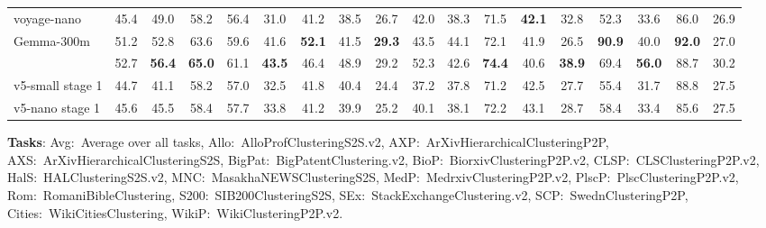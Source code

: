 \documentclass[11pt]{article}
\begin{document}
\begin{table}[H]
\begin{tabular}{l*{17}{c}}
voyage-nano & 45.4 & 49.0 & 58.2 & 56.4 & 31.0 & 41.2 & 38.5 & 26.7 & 42.0 & 38.3 & 71.5 & \textbf{42.1} & 32.8 & 52.3 & 33.6 & 86.0 & 26.9 \\
Gemma-300m & 51.2 & 52.8 & 63.6 & 59.6 & 41.6 & \textbf{52.1} & 41.5 & \textbf{29.3} & 43.5 & 44.1 & 72.1 & 41.9 & 26.5 & \textbf{90.9} & 40.0 & \textbf{92.0} & 27.0 \\
\JEmbeddingVFiveTextNanoShort{} & 52.7 & \textbf{56.4} & \textbf{65.0} & 61.1 & \textbf{43.5} & 46.4 & 48.9 & 29.2 & 52.3 & 42.6 & \textbf{74.4} & 40.6 & \textbf{38.9} & 69.4 & \textbf{56.0} & 88.7 & 30.2 \\
\midrule
v5-small stage 1 & 44.7 & 41.1 & 58.2 & 57.0 & 32.5 & 41.8 & 40.4 & 24.4 & 37.2 & 37.8 & 71.2 & 42.5 & 27.7 & 55.4 & 31.7 & 88.8 & 27.5 \\
v5-nano stage 1 & 45.6 & 45.5 & 58.4 & 57.7 & 33.8 & 41.2 & 39.9 & 25.2 & 40.1 & 38.1 & 72.2 & 43.1 & 28.7 & 58.4 & 33.4 & 85.6 & 27.5 \\

\bottomrule
\end{tabular}
\begin{flushleft}
\textbf{Tasks}: Avg:~Average over all tasks, 
Allo:~AlloProfClusteringS2S.v2,
AXP:~ArXivHierarchicalClusteringP2P,
AXS:~ArXivHierarchicalClusteringS2S,
BigPat:~BigPatentClustering.v2,
BioP:~BiorxivClusteringP2P.v2,
CLSP:~CLSClusteringP2P.v2,
HalS:~HALClusteringS2S.v2,
MNC:~MasakhaNEWSClusteringS2S,
MedP:~MedrxivClusteringP2P.v2,
PlscP:~PlscClusteringP2P.v2,
Rom:~RomaniBibleClustering,
S200:~SIB200ClusteringS2S,
SEx:~StackExchangeClustering.v2,
SCP:~SwednClusteringP2P,
Cities:~WikiCitiesClustering,
WikiP:~WikiClusteringP2P.v2.
\end{flushleft}
\end{table}
\end{document}
